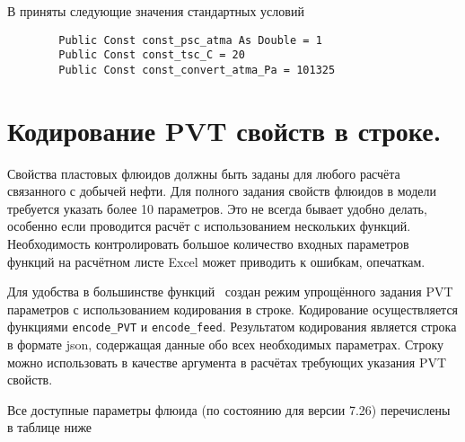 	В \unf{} приняты следующие значения стандартных условий
	
	
	\begin{listing}[H]
		\begin{verbatim}
		Public Const const_psc_atma As Double = 1
		Public Const const_tsc_C = 20
		Public Const const_convert_atma_Pa = 101325
		\end{verbatim}
	\end{listing}

\section{Кодирование PVT свойств в строке.}
Свойства пластовых флюидов должны быть заданы для любого расчёта связанного с добычей нефти. Для полного задания свойств флюидов в модели \unf{} требуется указать более 10 параметров. Это не всегда бывает удобно делать, особенно если проводится расчёт с использованием нескольких функций. Необходимость контролировать большое количество входных параметров функций на расчётном листе Excel может приводить к ошибкам, опечаткам.

Для удобства в большинстве функций \unf{} \ создан режим упрощённого задания PVT параметров с использованием кодирования в строке. Кодирование осуществляется функциями \texttt{encode_PVT} и \texttt{encode_feed}. Результатом кодирования является  строка в формате json, содержащая данные обо всех необходимых параметрах. Строку можно использовать в качестве аргумента в расчётах требующих указания PVT свойств.   



Все доступные параметры флюида (по состоянию для версии 7.26) перечислены в таблице ниже


